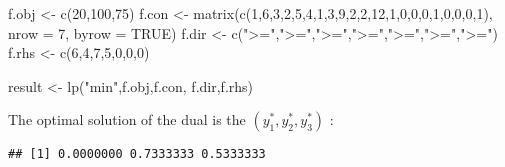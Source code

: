 \documentclass[
]{article}
\newenvironment{Shaded}{\begin{snugshade}}{\end{snugshade}}
\newcommand{\AttributeTok}[1]{\textcolor[rgb]{0.77,0.63,0.00}{#1}}
\newcommand{\ConstantTok}[1]{\textcolor[rgb]{0.00,0.00,0.00}{#1}}
\newcommand{\DecValTok}[1]{\textcolor[rgb]{0.00,0.00,0.81}{#1}}
\newcommand{\FunctionTok}[1]{\textcolor[rgb]{0.00,0.00,0.00}{#1}}
\newcommand{\NormalTok}[1]{#1}
\newcommand{\OtherTok}[1]{\textcolor[rgb]{0.56,0.35,0.01}{#1}}
\newcommand{\SpecialCharTok}[1]{\textcolor[rgb]{0.00,0.00,0.00}{#1}}
\newcommand{\StringTok}[1]{\textcolor[rgb]{0.31,0.60,0.02}{#1}}
\begin{document}
\begin{Shaded}
\begin{Highlighting}[]
\NormalTok{f.obj }\OtherTok{\textless{}{-}} \FunctionTok{c}\NormalTok{(}\DecValTok{20}\NormalTok{,}\DecValTok{100}\NormalTok{,}\DecValTok{75}\NormalTok{)}
\NormalTok{f.con }\OtherTok{\textless{}{-}} \FunctionTok{matrix}\NormalTok{(}\FunctionTok{c}\NormalTok{(}\DecValTok{1}\NormalTok{,}\DecValTok{6}\NormalTok{,}\DecValTok{3}\NormalTok{,}\DecValTok{2}\NormalTok{,}\DecValTok{5}\NormalTok{,}\DecValTok{4}\NormalTok{,}\DecValTok{1}\NormalTok{,}\DecValTok{3}\NormalTok{,}\DecValTok{9}\NormalTok{,}\DecValTok{2}\NormalTok{,}\DecValTok{2}\NormalTok{,}\DecValTok{12}\NormalTok{,}\DecValTok{1}\NormalTok{,}\DecValTok{0}\NormalTok{,}\DecValTok{0}\NormalTok{,}\DecValTok{0}\NormalTok{,}\DecValTok{1}\NormalTok{,}\DecValTok{0}\NormalTok{,}\DecValTok{0}\NormalTok{,}\DecValTok{0}\NormalTok{,}\DecValTok{1}\NormalTok{), }\AttributeTok{nrow =} \DecValTok{7}\NormalTok{, }\AttributeTok{byrow =} \ConstantTok{TRUE}\NormalTok{)}
\NormalTok{f.dir }\OtherTok{\textless{}{-}} \FunctionTok{c}\NormalTok{(}\StringTok{"\textgreater{}="}\NormalTok{,}\StringTok{"\textgreater{}="}\NormalTok{,}\StringTok{"\textgreater{}="}\NormalTok{,}\StringTok{"\textgreater{}="}\NormalTok{,}\StringTok{"\textgreater{}="}\NormalTok{,}\StringTok{"\textgreater{}="}\NormalTok{,}\StringTok{"\textgreater{}="}\NormalTok{)}
\NormalTok{f.rhs }\OtherTok{\textless{}{-}} \FunctionTok{c}\NormalTok{(}\DecValTok{6}\NormalTok{,}\DecValTok{4}\NormalTok{,}\DecValTok{7}\NormalTok{,}\DecValTok{5}\NormalTok{,}\DecValTok{0}\NormalTok{,}\DecValTok{0}\NormalTok{,}\DecValTok{0}\NormalTok{)}

\NormalTok{result }\OtherTok{\textless{}{-}} \FunctionTok{lp}\NormalTok{(}\StringTok{"min"}\NormalTok{,f.obj,f.con, f.dir,f.rhs)}
\end{Highlighting}
\end{Shaded}

The optimal solution of the dual is the \((y_1^*, y_2^*, y_3^*)\) :

\begin{Shaded}
\end{Shaded}

\begin{verbatim}
## [1] 0.0000000 0.7333333 0.5333333
\end{verbatim}
\end{document}
